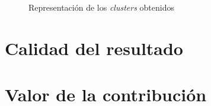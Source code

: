 \begin{figure}[h]
    \centering
    \caption{Representación de los \emph{clusters} obtenidos}
    \label{fig:clusters}
\end{figure}

\section{Calidad del resultado}\label{sec:calidadresultado}

\section{Valor de la contribución}\label{sec:valorcontribución}

